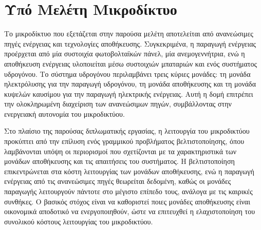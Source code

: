 \gr
\chapter{Υπό Μελέτη Μικροδίκτυο}
Το μικροδίκτυο που εξετάζεται στην παρούσα μελέτη αποτελείται από ανανεώσιμες πηγές ενέργειας και τεχνολογίες αποθήκευσης. Συγκεκριμένα, η παραγωγή ενέργειας προέρχεται από μία συστοιχία φωτοβολταϊκών πάνελ, μία ανεμογεννήτρια, ενώ η αποθήκευση ενέργειας υλοποιείται μέσω συστοιχιών μπαταριών και ενός συστήματος υδρογόνου. Το σύστημα υδρογόνου περιλαμβάνει τρεις κύριες μονάδες: τη μονάδα ηλεκτρόλυσης για την παραγωγή υδρογόνου, τη μονάδα αποθήκευσης και τη μονάδα κυψελών καυσίμου για την παραγωγή ηλεκτρικής ενέργειας. Αυτή η δομή επιτρέπει την ολοκληρωμένη διαχείριση των ανανεώσιμων πηγών, συμβάλλοντας στην ενεργειακή αυτονομία του μικροδικτύου.

Στο πλαίσιο της παρούσας διπλωματικής εργασίας, η λειτουργία του μικροδικτύου προκύπτει από την επίλυση ενός γραμμικού προβλήματος βελτιστοποίησης, όπου λαμβάνονται υπόψη οι περιορισμοί που σχετίζονται με τα χαρακτηριστικά των μονάδων αποθήκευσης και τις απαιτήσεις του συστήματος. Η βελτιστοποίηση επικεντρώνεται στα κόστη λειτουργίας των μονάδων αποθήκευσης, ενώ η παραγωγή ενέργειας από τις ανανεώσιμες πηγές θεωρείται δεδομένη, καθώς οι μονάδες παραγωγής λειτουργούν πάντοτε στο μέγιστο επίπεδο τους, ανάλογα με τις καιρικές συνθήκες. Ο βασικός στόχος είναι να καθοριστεί ποιες μονάδες αποθήκευσης είναι οικονομικά αποδοτικό να ενεργοποιηθούν, ώστε να επιτευχθεί η ελαχιστοποίηση του συνολικού κόστους λειτουργίας του μικροδικτύου.




